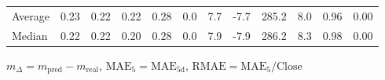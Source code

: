 \begin{threeparttable}
{\begin{tabular}{lrrrrrrrrrrr}
Average &          0.23 &          0.22 &          0.22 &        0.28 &                 0.0 &                 7.7 &       -7.7 &               285.2 &              8.0 &            0.96 &                   0.00 \\
 Median &          0.22 &          0.22 &          0.20 &        0.28 &                 0.0 &                 7.9 &       -7.9 &               286.2 &              8.3 &            0.98 &                   0.00 \\
\bottomrule
\end{tabular}
}
\begin{tablenotes}\footnotesize
\item $m_\Delta=m_{\text{pred}}-m_{\text{real}}$,
$\mathrm{MAE}_5=\mathrm{MAE}_{5\text{d}}$,
$\mathrm{RMAE}=\mathrm{MAE}_5/\text{Close}$
\end{tablenotes}
\end{threeparttable}
\endgroup

